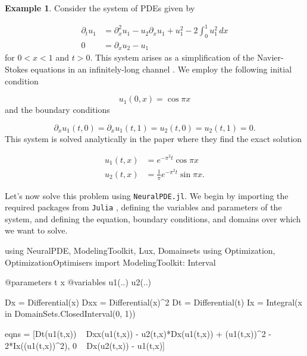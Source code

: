 \documentclass{CUP-JNL-DTM}%
\theoremstyle{definition}
\newtheorem{example}[theorem]{Example}
\numberwithin{equation}{section}
\newcommand{\Julia}{\texttt{Julia} }
\begin{document}
\begin{example}

Consider the system of PDEs given by 

\begin{equation}
    \begin{split}
        \partial_t u_1 & = \partial_x^2 u_1 - u_2 \partial_x u_1 + u_1^2 - 2\int_0^1 u_1^2 \,dx \\
        0 & = \partial_x u_2 - u_1
    \end{split}
\end{equation}
for $0 < x < 1$ and $t > 0$. This system arises as a simplification of the Navier-Stokes equations in an infinitely-long channel \cite{buddBlowupSystemPartial1994}. We employ the following initial condition

\begin{equation}
    u_1(0,x) = \cos \pi x
\end{equation}
and the boundary conditions

\begin{equation}
    \partial_x u_1(t,0) = \partial_x u_1(t,1) = u_2(t,0) = u_2(t,1) = 0. 
\end{equation}
This system is solved analytically in the paper \cite{benhammoudaAnalyticalSolutionsSystems2014} where they find the exact solution

\begin{equation}
    \begin{split}
        u_1(t,x) & = e^{-\pi^2t}\cos \pi x \\
        u_2(t,x) & = \frac{1}{\pi}e^{-\pi^2t} \sin \pi x. 
    \end{split}
\end{equation}

Let's now solve this problem using \texttt{NeuralPDE.jl}. We begin by importing the required packages from \Julia, defining the variables and parameters of the system, and defining the equation, boundary conditions, and domains over which we want to solve. 

\begin{jllisting}
using NeuralPDE, ModelingToolkit, Lux, Domainsets
using Optimization, OptimizationOptimisers
import ModelingToolkit: Interval

@parameters t x
@variables u1(..) u2(..)

Dx = Differential(x)
Dxx = Differential(x)^2
Dt = Differential(t)
Ix = Integral(x in DomainSets.ClosedInterval(0, 1))

eqns = [Dt(u1(t,x)) ~ Dxx(u1(t,x)) - u2(t,x)*Dx(u1(t,x)) + 
                                        (u1(t,x))^2 - 2*Ix((u1(t,x))^2),
        0 ~ Dx(u2(t,x)) - u1(t,x)]


\end{jllisting}
\end{example}
\end{document}
